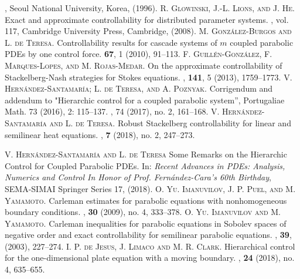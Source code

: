 \documentclass{aims}
\theoremstyle{definition}
\begin{document}
\begin{thebibliography}{99}
, Seoul National University, Korea, (1996).
%
\textsc{R. Glowinski, J.-L. Lions, and J. He.}
\newblock Exact and approximate controllability for distributed parameter systems.
, vol. 117, Cambridge University Press, Cambridge, (2008).
%
\textsc{M. Gonz\'alez-Burgos and L. de Teresa.}
\newblock Controllability results for cascade systems of $m$ coupled parabolic PDEs by one control force.
 \textbf{67}, 1 (2010), 91--113.
%
\textsc{F. Guill\'en-Gonz\'alez, F. Marques-Lopes, and M. Rojas-Medar.}
\newblock On the approximate controllability of {S}tackelberg-{N}ash strategies
  for {S}tokes equations.
, \textbf{141}, 5 (2013),
  1759--1773.
\textsc{V. Hern\'andez-Santamar\'ia; L. de Teresa, and A. Poznyak}.
\newblock Corrigendum and addendum to "Hierarchic control for a coupled parabolic system'', Portugaliae Math. 73 (2016), 2: 115--137. 
, 74 (2017), no. 2, 161--168.
\textsc{V. Hern\'andez-Santamar\'ia and L. de Teresa.}
\newblock Robust Stackelberg controllability for linear and semilinear heat equations. 
, \textbf{7} (2018), no. 2, 247--273.

\textsc{V. Hern\'andez-Santamar\'ia and L. de Teresa}
\newblock Some Remarks on the Hierarchic Control for Coupled Parabolic PDEs.
\newblock In: {\em Recent Advances in PDEs: Analysis, Numerics and Control
In Honor of Prof. Fern\'andez-Cara's 60th Birthday}, SEMA-SIMAI Springer Series 17, (2018).
%
\textsc{O. Yu. Imanuvilov, J. P. Puel, and M. Yamamoto.}
\newblock Carleman estimates for parabolic equations with nonhomogeneous boundary conditions. 
, \textbf{30} (2009), no. 4, 333--378.
\textsc{O. Yu. Imanuvilov and M. Yamamoto.}
\newblock Carleman inequalities for parabolic equations in {S}obolev spaces of negative order and exact controllability for semilinear parabolic equations.
, \textbf{39}, (2003), 227--274.
%
\textsc{I. P. de Jesus, J. Limaco and M. R. Clark.}
\newblock Hierarchical control for the one-dimensional plate equation with a moving boundary. 
, \textbf{24} (2018), no. 4, 635--655.


\end{thebibliography}
\end{document}
